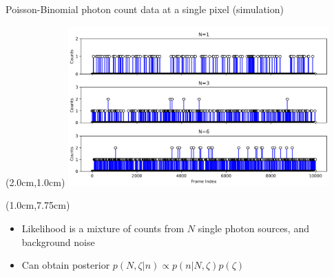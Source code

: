 \documentclass{beamer}					%
\begin{document}
\begin{frame}{Poisson-Binomial photon count data at a single pixel (simulation)}
\begin{textblock*}{10cm}(2.0cm,1.0cm)
\includegraphics[width=10cm]{../../spad/spad/media/Counts.png}
\end{textblock*}
\begin{textblock*}{13cm}(1.0cm,7.75cm)
\begin{itemize}
\item Likelihood is a mixture of counts from $N$ single photon sources, and background noise
\item Can obtain posterior $p(N,\zeta\lvert n) \propto p(n\lvert N,\zeta)p(\zeta)$
\end{itemize}
\end{textblock*}

\end{frame}
\end{document}
